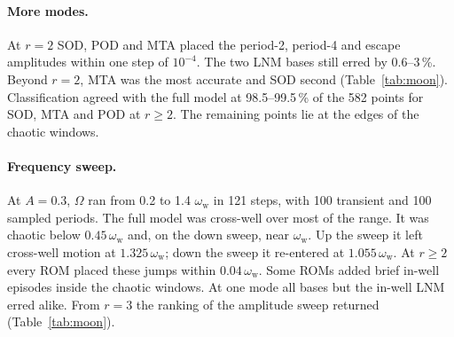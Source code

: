 \documentclass[preprint,12pt]{elsarticle}
\begin{document}
\paragraph{More modes.} At $r=2$ SOD, POD and MTA placed the period-2, period-4 and escape amplitudes within one step of $10^{-4}$. The two LNM bases still erred by 0.6--3\,\%. Beyond $r=2$, MTA was the most accurate and SOD second (Table~\ref{tab:moon}). Classification agreed with the full model at 98.5--99.5\,\% of the 582 points for SOD, MTA and POD at $r\ge2$. The remaining points lie at the edges of the chaotic windows.

\paragraph{Frequency sweep.} At $A=0.3$, $\varOmega$ ran from 0.2 to 1.4 $\omega_{\mathrm w}$ in 121 steps, with 100 transient and 100 sampled periods. The full model was cross-well over most of the range. It was chaotic below $0.45\,\omega_{\mathrm w}$ and, on the down sweep, near $\omega_{\mathrm w}$. Up the sweep it left cross-well motion at $1.325\,\omega_{\mathrm w}$; down the sweep it re-entered at $1.055\,\omega_{\mathrm w}$. At $r\ge2$ every ROM placed these jumps within $0.04\,\omega_{\mathrm w}$. Some ROMs added brief in-well episodes inside the chaotic windows. At one mode all bases but the in-well LNM erred alike. From $r=3$ the ranking of the amplitude sweep returned (Table~\ref{tab:moon}).
\end{document}
